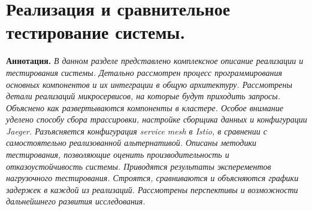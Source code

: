 \chapter{Реализация и сравнительное тестирование системы.}

\textbf{Аннотация.} \textit{В данном разделе представлено комплексное описание реализации и тестирования системы. Детально рассмотрен процесс программирования основных компонентов и их интеграции в общую архитектуру. Рассмотрены детали реализаций микросервисов, на которые будут приходить запросы. Объяснено как развертываются компоненты в кластере. Особое внимание уделено способу сбора трассировки, настройке сборщика данных и конфигурации Jaeger. Разъясняется конфигурация service mesh в Istio, в сравнении с самостоятельно реализованной альтернативой. Описаны методики тестирования, позволяющие оценить производительность и отказоустойчивость системы. Приводятся результаты эксперементов нагрузочного тестирования. Строятся, сравниваются и объясняются графики задержек в каждой из реализаций.  Рассмотрены перспективы и возможности дальнейшнего развития исследования.}





% 


